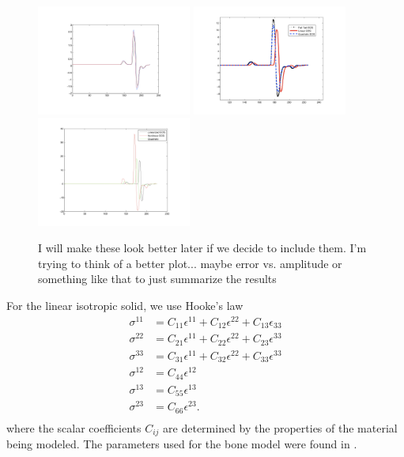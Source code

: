 \documentclass{article}
\begin{document}
\begin{figure}
\includegraphics[width=2in]{linearization_small_amp.pdf}
\includegraphics[width=2in]{med_amplitude_comp.pdf}
\includegraphics[width=2in]{higher_amplitude.pdf}
\label{fig:tait_linearization}
\caption{I will make these look better later if we decide to include them.  I'm trying to think of a better 
plot... maybe error vs. amplitude or something like that to just summarize the results}
\end{figure}

For the linear isotropic solid, we use Hooke's law
\begin{align*}
\sigma^{11} &= C_{11} \epsilon^{11} + C_{12} \epsilon^{22} + C_{13} \epsilon_{33} \\
\sigma^{22} &= C_{21} \epsilon^{11} + C_{22} \epsilon^{22} + C_{23} \epsilon^{33}  \\
\sigma^{33} &=C_{31} \epsilon^{11} + C_{32} \epsilon^{22} + C_{33} \epsilon^{33}  \\
\sigma^{12} &= C_{44} \epsilon^{12} \\
\sigma^{13} &= C_{55} \epsilon^{13}\\
\sigma^{23} &=  C_{66} \epsilon^{23}. \\
\end{align*}
where the scalar coefficients $C_{ij}$ are determined by the properties of the material being modeled.  
The parameters used for the bone model were found in \cite{burr}.
\end{document}
